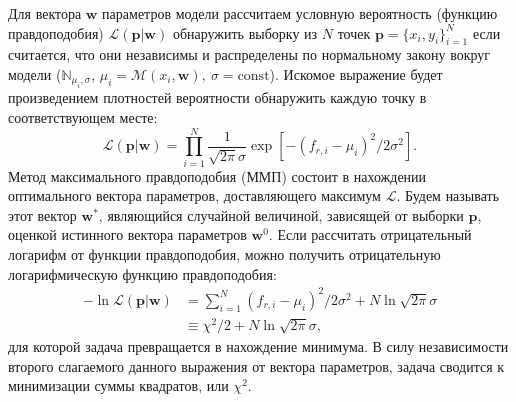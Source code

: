 \documentclass[14pt, a4paper]{extreport}
\numberwithin{equation}{section}
\begin{document}
Для вектора $ \mathbf{w} $ параметров модели рассчитаем условную вероятность (функцию правдоподобия) $\mathcal{L}(\mathbf{p}|\mathbf{w})$ обнаружить выборку из $ N $ точек $\mathbf{p} = \{x_i, y_i\}_{i=1}^N$ если считается, что они независимы и распределены по нормальному закону вокруг модели ($\mathbb{N}_{\mu_i, \sigma}$, $\mu_i = \mathcal{M}(x_i, \mathbf{w}),\ \sigma = \text{const}$). Искомое выражение будет произведением плотностей вероятности обнаружить каждую точку в соответствующем месте:
\begin{equation}
\mathcal{L}(\mathbf{p}|\mathbf{w}) = \prod_{i=1}^{N} \frac{1}{\sqrt{2\pi}\sigma} \exp[ -(f_{r,i} - \mu_i)^2 / 2 \sigma^2].\label{eq:MLE} 
\end{equation}
Метод максимального правдоподобия (ММП) состоит в нахождении оптимального вектора параметров, доставляющего максимум $\mathcal{L}$. Будем называть этот вектор $ \mathbf{w}^*$, являющийся случайной величиной, зависящей от выборки $\mathbf{p}$, оценкой истинного вектора параметров $\mathbf{w}^0$. Если рассчитать отрицательный логарифм от функции правдоподобия, можно получить отрицательную логарифмическую функцию правдоподобия:
\begin{align*}
- \ln \mathcal{L}(\mathbf{p}|\mathbf{w}) &= \sum_{i=1}^N (f_{r,i} - \mu_i)^2 / 2 \sigma^2 + N \ln\sqrt{2\pi}\sigma
\label{eq:logL} \\
&\equiv \chi^2/2 + N\ln \sqrt{2\pi}\sigma,
\end{align*}
для которой задача превращается в нахождение минимума. В силу независимости второго слагаемого данного выражения от вектора параметров, задача сводится к минимизации суммы квадратов, или $\chi^2$.
\end{document}
